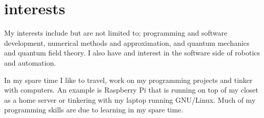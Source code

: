 \documentclass[]{twentysecondcv}
\begin{document}






\makeprofile


\section{interests}
My interests include but are not limited to; programming and software
development, numerical methods and approximation, and quantum
mechanics and quantum field theory. I also have and interest in the
software side of robotics and automation.

In my spare time I like to travel, work on my programming projects and
tinker with computers. An example is Raspberry Pi that is
running on top of my closet as a home server or tinkering with my
laptop running GNU/Linux. Much of my programming skills are due to
learning in my spare time. 
\end{document}
